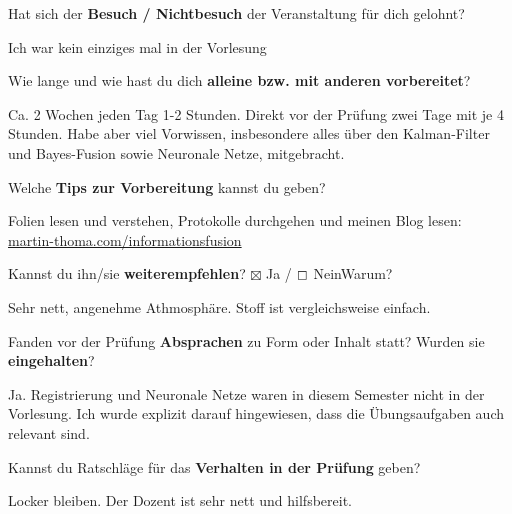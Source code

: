 \documentclass[a4paper]{article}
\begin{document}
 \begin{multicols}{2}

   Hat sich der \textbf{Besuch / Nichtbesuch} der Veranstaltung für dich gelohnt? \\
  \begin{minipage}[t][6.8cm]{\linewidth}
    Ich war kein einziges mal in der Vorlesung

  \end{minipage}

   Wie lange und wie hast du dich \textbf{alleine bzw. mit anderen vorbereitet}? \\
  \begin{minipage}[t][7cm]{\linewidth}
    Ca. 2 Wochen jeden Tag 1-2 Stunden. Direkt vor der Prüfung zwei Tage mit
    je 4 Stunden. Habe aber viel Vorwissen, insbesondere alles über den
    Kalman-Filter und Bayes-Fusion sowie Neuronale Netze, mitgebracht.

  \end{minipage}

   Welche \textbf{Tips zur Vorbereitung} kannst du geben?\\
  \begin{minipage}[t][7cm]{\linewidth}
    Folien lesen und verstehen, Protokolle durchgehen und
    meinen Blog lesen:\\
    \href{https://martin-thoma.com/informationsfusion/}{martin-thoma.com/informationsfusion}
  \end{minipage}

\columnbreak

   Kannst du ihn/sie \textbf{weiterempfehlen}?
  $\boxtimes$ Ja / $\boxempty$ Nein\newline Warum? \\
  \begin{minipage}[t][6.8cm]{\linewidth}
    Sehr nett, angenehme Athmosphäre. Stoff ist vergleichsweise einfach.

  \end{minipage}

   Fanden vor der Prüfung \textbf{Absprachen} zu Form oder Inhalt statt? Wurden sie \textbf{eingehalten}? \\
  \begin{minipage}[t][7cm]{\linewidth}
    Ja. Registrierung und Neuronale Netze waren in diesem Semester nicht in der
    Vorlesung. Ich wurde explizit darauf hingewiesen, dass die Übungsaufgaben
    auch relevant sind.

  \end{minipage}

   Kannst du Ratschläge für das \textbf{Verhalten in der Prüfung} geben? \\
  \begin{minipage}[t][6.8cm]{\linewidth}
    Locker bleiben. Der Dozent ist sehr nett und hilfsbereit.

  \end{minipage}
%
\end{multicols}
\end{document}
